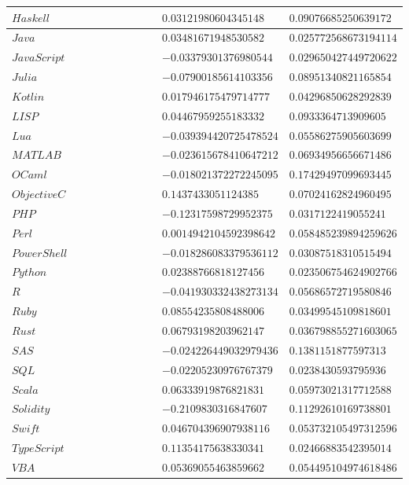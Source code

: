 \documentclass{report}
\begin{document}
\begin{longtable}{|R{0.4\linewidth}|R{0.3\linewidth}|R{0.3\linewidth}|}
  \hline
  $Haskell$ & $0.03121980604345148$ & $0.09076685250639172$\\
  \hline
  $Java$ & $0.03481671948530582$ & $0.025772568673194114$\\
  \hline
  $JavaScript$ & $-0.03379301376980544$ & $0.029650427449720622$\\
  \hline
  $Julia$ & $-0.07900185614103356$ & $0.08951340821165854$\\
  \hline
  $Kotlin$ & $0.017946175479714777$ & $0.04296850628292839$\\
  \hline
  $LISP$ & $0.04467959255183332$ & $0.0933364713909605$\\
  \hline
  $Lua$ & $-0.039394420725478524$ & $0.05586275905603699$\\
  \hline
  $MATLAB$ & $-0.023615678410647212$ & $0.06934956656671486$\\
  \hline
  $OCaml$ & $-0.018021372272245095$ & $0.17429497099693445$\\
  \hline
  $ObjectiveC$ & $0.1437433051124385$ & $0.07024162824960495$\\
  \hline
  $PHP$ & $-0.12317598729952375$ & $0.0317122419055241$\\
  \hline
  $Perl$ & $0.0014942104592398642$ & $0.058485239894259626$\\
  \hline
  $PowerShell$ & $-0.018286083379536112$ & $0.03087518310515494$\\
  \hline
  $Python$ & $0.02388766818127456$ & $0.023506754624902766$\\
  \hline
  $R$ & $-0.041930332438273134$ & $0.05686572719580846$\\
  \hline
  $Ruby$ & $0.08554235808488006$ & $0.03499545109818601$\\
  \hline
  $Rust$ & $0.06793198203962147$ & $0.036798855271603065$\\
  \hline
  $SAS$ & $-0.024226449032979436$ & $0.1381151877597313$\\
  \hline
  $SQL$ & $-0.02205230976767379$ & $0.0238430593795936$\\
  \hline
  $Scala$ & $0.06333919876821831$ & $0.05973021317712588$\\
  \hline
  $Solidity$ & $-0.2109830316847607$ & $0.11292610169738801$\\
  \hline
  $Swift$ & $0.046704396907938116$ & $0.053732105497312596$\\
  \hline
  $TypeScript$ & $0.11354175638330341$ & $0.02466883542395014$\\
  \hline
  $VBA$ & $0.05369055463859662$ & $0.054495104974618486$\\

\end{longtable}
\end{document}
